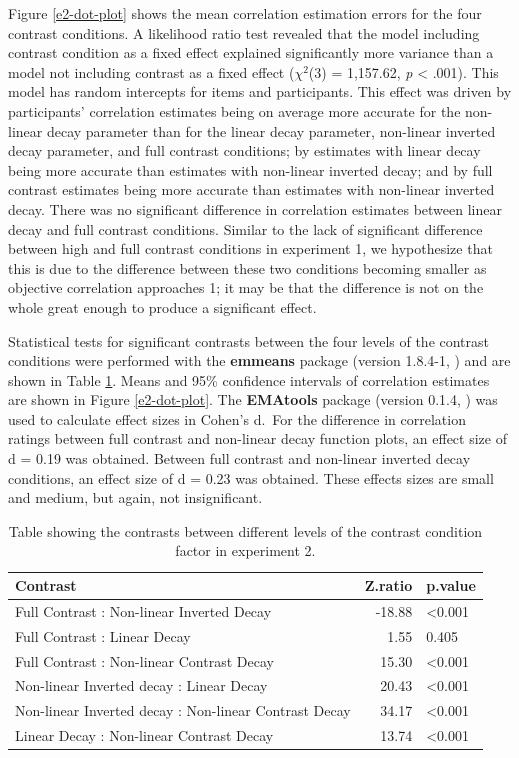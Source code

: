 \documentclass[preprint, 3p,
authoryear]{elsarticle} %
\begin{document}
Figure \ref{e2-dot-plot} shows the mean correlation estimation errors
for the four contrast conditions. A likelihood ratio test revealed that
the model including contrast condition as a fixed effect explained
significantly more variance than a model not including contrast as a
fixed effect (\(\chi^2\)(3) = 1,157.62, \emph{p} \textless{} .001). This
model has random intercepts for items and participants. This effect was
driven by participants' correlation estimates being on average more
accurate for the non-linear decay parameter than for the linear decay
parameter, non-linear inverted decay parameter, and full contrast
conditions; by estimates with linear decay being more accurate than
estimates with non-linear inverted decay; and by full contrast estimates
being more accurate than estimates with non-linear inverted decay. There
was no significant difference in correlation estimates between linear
decay and full contrast conditions. Similar to the lack of significant
difference between high and full contrast conditions in experiment 1, we
hypothesize that this is due to the difference between these two
conditions becoming smaller as objective correlation approaches 1; it
may be that the difference is not on the whole great enough to produce a
significant effect.

Statistical tests for significant contrasts between the four levels of
the contrast conditions were performed with the \textbf{emmeans} package
(version 1.8.4-1, \citealp{emmeans}) and are shown in Table
\ref{contrasts-table-e2}. Means and 95\% confidence intervals of
correlation estimates are shown in Figure \ref{e2-dot-plot}. The
\textbf{EMAtools} package (version 0.1.4, \citealp{ematools}) was used
to calculate effect sizes in Cohen's d.~For the difference in
correlation ratings between full contrast and non-linear decay function
plots, an effect size of d = 0.19 was obtained. Between full contrast
and non-linear inverted decay conditions, an effect size of d = 0.23 was
obtained. These effects sizes are small and medium, but again, not
insignificant.

\begin{table}

\caption{\label{tab:contrasts-table-e2}\label{contrasts-table-e2}Table showing the contrasts between different levels of the contrast condition factor in experiment 2.}
\centering
\begin{tabular}[t]{lrl}
\toprule
Contrast & Z.ratio & p.value\\
\midrule
Full Contrast : Non-linear Inverted Decay & -18.88 & <0.001\\
Full Contrast : Linear Decay & 1.55 & 0.405\\
Full Contrast : Non-linear Contrast Decay & 15.30 & <0.001\\
Non-linear Inverted decay : Linear Decay & 20.43 & <0.001\\
Non-linear Inverted decay : Non-linear Contrast Decay & 34.17 & <0.001\\
\addlinespace
Linear Decay : Non-linear Contrast Decay & 13.74 & <0.001\\
\bottomrule
\end{tabular}
\end{table}
\end{document}
